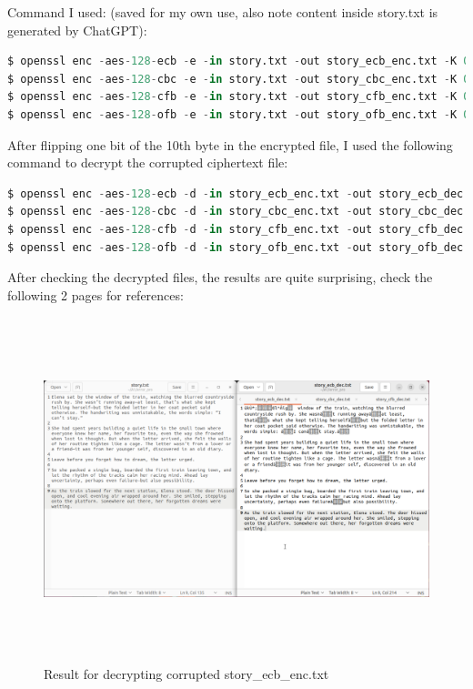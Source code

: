 \documentclass{article}
\begin{document}
Command I used: (saved for my own use, also note content inside story.txt is generated by ChatGPT):
\begin{lstlisting}[language=Python]
$ openssl enc -aes-128-ecb -e -in story.txt -out story_ecb_enc.txt -K 00112233445566778889aabbccddeeff
$ openssl enc -aes-128-cbc -e -in story.txt -out story_cbc_enc.txt -K 00112233445566778889aabbccddeeff -iv 0102030405060708090a0b0c0d0e0f10
$ openssl enc -aes-128-cfb -e -in story.txt -out story_cfb_enc.txt -K 00112233445566778889aabbccddeeff -iv 0102030405060708090a0b0c0d0e0f10
$ openssl enc -aes-128-ofb -e -in story.txt -out story_ofb_enc.txt -K 00112233445566778889aabbccddeeff -iv 0102030405060708090a0b0c0d0e0f10
\end{lstlisting}
After flipping one bit of the 10th byte in the encrypted file, I used the following command to decrypt the corrupted ciphertext file:
\begin{lstlisting}[language=Python]
$ openssl enc -aes-128-ecb -d -in story_ecb_enc.txt -out story_ecb_dec.txt -K 00112233445566778889aabbccddeeff
$ openssl enc -aes-128-cbc -d -in story_cbc_enc.txt -out story_cbc_dec.txt -K 00112233445566778889aabbccddeeff -iv 0102030405060708090a0b0c0d0e0f10
$ openssl enc -aes-128-cfb -d -in story_cfb_enc.txt -out story_cfb_dec.txt -K 00112233445566778889aabbccddeeff -iv 0102030405060708090a0b0c0d0e0f10
$ openssl enc -aes-128-ofb -d -in story_ofb_enc.txt -out story_ofb_dec.txt -K 00112233445566778889aabbccddeeff -iv 0102030405060708090a0b0c0d0e0f10
\end{lstlisting}
After checking the decrypted files, the results are quite surprising, check the following 2 pages for references:
\begin{figure}[h]
    \centering
    \includegraphics[height=10cm]{images/text_comp_ecb.png}
    \caption{Result for decrypting corrupted story\_ecb\_enc.txt}
\end{figure}
\end{document}
